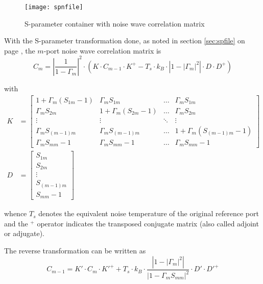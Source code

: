 \documentclass[10pt]{report}
\begin{document}
\begin{figure}[ht]
\begin{center}
\texttt{[image: spnfile]}
\end{center}
\caption{S-parameter container with noise wave correlation matrix}
\label{fig:spnfile}
\end{figure}
\FloatBarrier

With the S-parameter transformation done, as noted in section
\ref{sec:spfile} on page \pageref{sec:spfile}, the $m$-port noise wave
correlation matrix is
\begin{equation}
C_m = \left|\dfrac{1}{1 - \Gamma_m}\right|^2 \cdot \left(K\cdot C_{m-1}\cdot K^+ -T_s\cdot k_B \cdot\left|1 - \left|\Gamma_m\right|^2\right|\cdot D\cdot D^+\right)
\end{equation}

with
\begin{align}
K &=
\begin{bmatrix}
1 + \Gamma_m\left(S_{1m} -1\right) & \Gamma_m S_{1m} & \ldots & \Gamma_m S_{1m}\\
\Gamma_m S_{2m} & 1 + \Gamma_m\left(S_{2m} -1\right) & \ldots & \Gamma_m S_{2m}\\
\vdots & \vdots & \ddots & \vdots\\
\Gamma_m S_{(m-1)m} & \Gamma_m S_{(m-1)m} & \ldots & 1 + \Gamma_m\left(S_{(m-1)m} -1\right)\\
\Gamma_m S_{mm} - 1 & \Gamma_m S_{mm} - 1 & \ldots & \Gamma_m S_{mm} - 1
\end{bmatrix}\\
D &=
\begin{bmatrix}
S_{1m}\\
S_{2m}\\
\vdots\\
S_{(m-1)m}\\
S_{mm} - 1
\end{bmatrix}
\end{align}

whence $T_s$ denotes the equivalent noise temperature of the original
reference port and the $ ^{+}$ operator indicates the transposed
conjugate matrix (also called adjoint or adjugate).

\addvspace{12pt}

The reverse transformation can be written as
\begin{equation}
C_{m-1} = K'\cdot C_m\cdot K'^+ +T_s\cdot k_B \cdot\dfrac{\left|1 - \left|\Gamma_m\right|^2\right|}{\left|1 - \Gamma_m S_{mm}\right|^2}\cdot D'\cdot D'^+
\end{equation}
\end{document}
